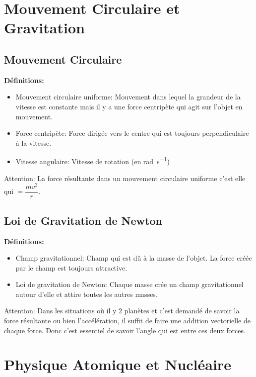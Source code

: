 \documentclass[french, a4paper, 12pt]{article}
\begin{document}
\section{Mouvement Circulaire et Gravitation}
\subsection{Mouvement Circulaire}
\textbf{Définitions:}
\begin{itemize}
\item Mouvement circulaire uniforme: Mouvement dans lequel la grandeur de la vitesse est constante mais il y a une force centripète qui agit sur l'objet en mouvement.
\item Force centripète: Force dirigée vers le centre qui est toujours perpendiculaire à la vitesse.
\item Vitesse angulaire: Vitesse de rotation (en \si{\radian\per\second})
\end{itemize}
Attention: La force résultante dans un mouvement circulaire uniforme c'est elle qui $=\dfrac{mv^2}{r}$.

\subsection{Loi de Gravitation de Newton}
\textbf{Définitions:}
\begin{itemize}
\item Champ gravitationnel: Champ qui est dû à la masse de l'objet. La force créée par le champ est toujours attractive.
\item Loi de gravitation de Newton: Chaque masse crée un champ gravitationnel autour d'elle et attire toutes les autres masses.
\end{itemize}
Attention: Dans les situations où il y 2 planètes et c'est demandé de savoir la force résultante ou bien l'accélération, il suffit de faire une addition vectorielle de chaque force. Donc c'est essentiel de savoir l'angle qui est entre ces deux forces.
\pagebreak

\section{Physique Atomique et Nucléaire}
\end{document}
